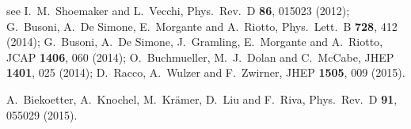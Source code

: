 

  see \eg 
  I.~M.~Shoemaker and L.~Vecchi,
  Phys.\ Rev.\ D {\bf 86}, 015023 (2012);
  G.~Busoni, A.~De Simone, E.~Morgante and A.~Riotto,
  Phys.\ Lett.\ B {\bf 728}, 412 (2014);
  G.~Busoni, A.~De Simone, J.~Gramling, E.~Morgante and A.~Riotto,
  JCAP {\bf 1406}, 060 (2014);
  O.~Buchmueller, M.~J.~Dolan and C.~McCabe,
  JHEP {\bf 1401}, 025 (2014);
  D.~Racco, A.~Wulzer and F.~Zwirner,
  JHEP {\bf 1505}, 009 (2015).

  A.~Biekoetter, A.~Knochel, M.~Kr\"amer, D.~Liu and F.~Riva,
  Phys.\ Rev.\ D {\bf 91}, 055029 (2015).

